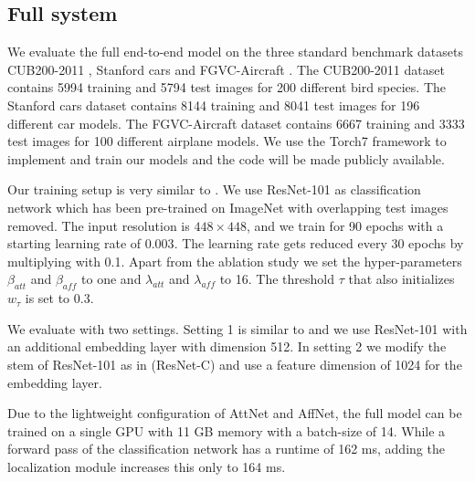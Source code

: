 \documentclass{bmvc2k}
\begin{document}
\subsection{Full system}
We evaluate the full end-to-end model on the three standard benchmark datasets CUB200-2011 \cite{birds}, Stanford cars \cite{cars} and FGVC-Aircraft \cite{aircraft}. The CUB200-2011 dataset contains 5994 training and 5794 test images for 200 different bird species. The Stanford cars dataset contains 8144 training and 8041 test images for 196 different car models. The FGVC-Aircraft dataset contains 6667 training and 3333 test images for 100 different airplane models. We use the Torch7 framework \cite{collobert2011torch7} to implement and train our models and the code will be made publicly available.

Our training setup is very similar to \cite{Hanselmann_2020_WACV}. We use ResNet-101 \cite{he2016deep} as classification network which has been pre-trained on ImageNet \cite{he2016deep} with overlapping test images removed. The input resolution is $448 \times 448$, and we train for 90 epochs with a starting learning rate of $0.003$. The learning rate gets reduced every 30 epochs by multiplying with 0.1. Apart from the ablation study we set the hyper-parameters $\beta_{att}$ and $\beta_{aff}$ to one and $\lambda_{att}$ and $\lambda_{aff}$ to 16. The threshold $\tau$ that also initializes $w_{\tau}$ is set to 0.3.

We evaluate with two settings. Setting 1 is similar to \cite{Hanselmann_2020_WACV} and we use ResNet-101 with an additional embedding layer with dimension 512. In setting 2 we modify the stem of ResNet-101 as in \cite{he2019bag} (ResNet-C) and use a feature dimension of 1024 for the embedding layer.

Due to the lightweight configuration of AttNet and AffNet, the full model can be trained on a single GPU with 11 GB memory with a batch-size of 14. While a forward pass of the classification network has a runtime of 162 ms, adding the localization module increases this only to 164 ms.
\end{document}
